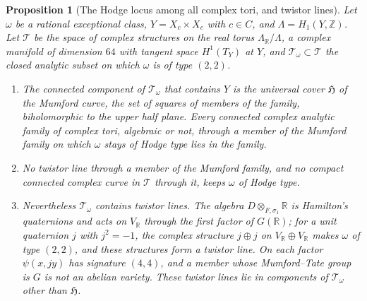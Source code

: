 \documentclass[11pt,reqno]{amsart}
\theoremstyle{plain}
\newtheorem{proposition}[theorem]{Proposition}
\theoremstyle{definition}
\theoremstyle{remark}
\newcommand{\ZZ}{\mathbb{Z}}
\newcommand{\RR}{\mathbb{R}}
\begin{document}
\begin{proposition}[The Hodge locus among all complex tori, and twistor
lines]\label{prop:notwistor}
Let $\omega$ be a rational exceptional class, $Y=X_{c}\times X_{c}$ with
$c\in C$, and $\Lambda=H_{1}(Y,\ZZ)$. Let $\mathcal{T}$ be the space of
complex structures on the real torus $\Lambda_{\RR}/\Lambda$, a complex
manifold of dimension $64$ with tangent space $H^{1}(T_{Y})$ at $Y$, and
$\mathcal{T}_{\omega}\subset\mathcal{T}$ the closed analytic subset on which
$\omega$ is of type $(2,2)$.
\begin{enumerate}[label=\textup{(\roman*)},leftmargin=2.6em,itemsep=2pt]
\item The connected component of $\mathcal{T}_{\omega}$ that contains $Y$ is
  the universal cover $\mathfrak{H}$ of the Mumford curve, the set of
  squares of members of the family, biholomorphic to the upper half plane.
  Every connected complex analytic family of complex tori, algebraic or not,
  through a member of the Mumford family on which $\omega$ stays of Hodge
  type lies in the family.
\item No twistor line through a member of the Mumford family, and no compact
  connected complex curve in $\mathcal{T}$ through it, keeps $\omega$ of
  Hodge type.
\item Nevertheless $\mathcal{T}_{\omega}$ contains twistor lines. The algebra
  $D\otimes_{F,\sigma_{1}}\RR$ is Hamilton's quaternions and acts on
  $V_{\RR}$ through the first factor of $G(\RR)$; for a unit quaternion $j$
  with $j^{2}=-1$, the complex structure $j\oplus j$ on $V_{\RR}\oplus
  V_{\RR}$ makes $\omega$ of type $(2,2)$, and these structures form a twistor
  line. On each factor $\psi(x,jy)$ has signature $(4,4)$, and a member whose
  Mumford--Tate group is $G$ is not an abelian variety. These twistor lines
  lie in components of $\mathcal{T}_{\omega}$ other than $\mathfrak{H}$.
\end{enumerate}
\end{proposition}
\end{document}
